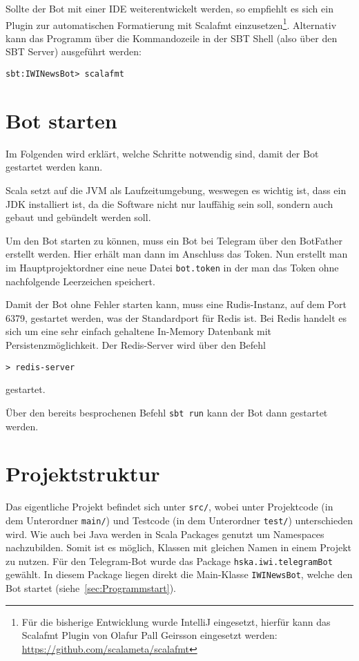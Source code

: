 Sollte der Bot mit einer IDE weiterentwickelt werden, so empfiehlt es sich ein Plugin zur automatischen Formatierung mit Scalafmt einzusetzen\footnote{Für die bisherige Entwicklung wurde IntelliJ eingesetzt, hierfür kann das Scalafmt Plugin von Olafur Pall Geirsson eingesetzt werden: \url{https://github.com/scalameta/scalafmt}}. Alternativ kann das Programm über die Kommandozeile in der SBT Shell (also über den SBT Server) ausgeführt werden:

\begin{lstlisting}
sbt:IWINewsBot> scalafmt
\end{lstlisting}

\section{Bot starten}
Im Folgenden wird erklärt, welche Schritte notwendig sind, damit der Bot gestartet werden kann.

Scala setzt auf die JVM als Laufzeitumgebung, weswegen es wichtig ist, dass ein JDK installiert ist, da die Software nicht nur lauffähig sein soll, sondern auch gebaut und gebündelt werden soll.

Um den Bot starten zu können, muss ein Bot bei Telegram über den BotFather erstellt werden. Hier erhält man dann im Anschluss das Token. Nun erstellt man im Hauptprojektordner eine neue Datei \texttt{bot.token} in der man das Token ohne nachfolgende Leerzeichen speichert.

Damit der Bot ohne Fehler starten kann, muss eine Rudis-Instanz, auf dem Port 6379, gestartet werden, was der Standardport für Redis ist. Bei Redis handelt es sich um eine sehr einfach gehaltene In-Memory Datenbank mit Persistenzmöglichkeit. Der Redis-Server wird über den Befehl

\begin{lstlisting}
> redis-server
\end{lstlisting}

gestartet.

Über den bereits besprochenen Befehl \texttt{sbt run} kann der Bot dann gestartet werden.

\section{Projektstruktur}
Das eigentliche Projekt befindet sich unter \texttt{src/}, wobei unter Projektcode (in dem Unterordner \texttt{main/}) und Testcode (in dem Unterordner \texttt{test/}) unterschieden wird. Wie auch bei Java werden in Scala Packages genutzt um Namespaces nachzubilden. Somit ist es möglich, Klassen mit gleichen Namen in einem Projekt zu nutzen. Für den Telegram-Bot wurde das Package \texttt{hska.iwi.telegramBot} gewählt. In diesem Package liegen direkt die Main-Klasse \texttt{IWINewsBot}, welche den Bot startet (siehe~\autoref{sec:Programmstart}).

